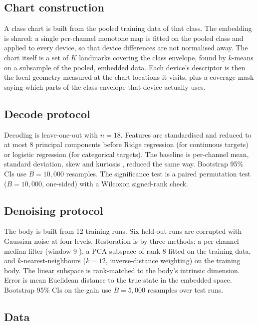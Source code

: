 \documentclass[11pt]{article}
\begin{document}
\subsection{Chart construction}
\label{sec:chart}

A class chart is built from the pooled training data of that class. The
embedding is shared: a single per-channel monotone map is fitted on the pooled
class and applied to every device, so that device differences are not
normalised away. The chart itself is a set of $K$ landmarks covering the class
envelope, found by $k$-means \cite{macqueen1967} on a subsample of the pooled,
embedded data. Each device's descriptor is then the local geometry measured at
the chart locations it visits, plus a coverage mask saying which parts of the
class envelope that device actually uses.

\subsection{Decode protocol}

Decoding is leave-one-out with $n=18$. Features are standardised and reduced
to at most 8 principal components before Ridge regression
\cite{hoerl1970} (for continuous targets) or logistic regression
\cite{cox1958} (for categorical targets). The baseline is per-channel mean,
standard deviation, skew \cite{pearson1895} and kurtosis
\cite{pearson1905}, reduced the same way. Bootstrap 95\% CIs use
$B = 10{,}000$ resamples. The significance test is a paired permutation test
($B = 10{,}000$, one-sided) with a Wilcoxon signed-rank
\cite{wilcoxon1945} check.

\subsection{Denoising protocol}

The body is built from 12 training runs. Six held-out runs are corrupted with
Gaussian noise at four levels. Restoration is by three methods: a per-channel
median filter (window 9 \cite{tukey1977}), a PCA subspace of rank 8
\cite{pearson1901} fitted on the training data, and $k$-nearest-neighbours
($k=12$, inverse-distance weighting) on the training body. The linear subspace
is rank-matched to the body's intrinsic dimension. Error is mean Euclidean
distance to the true state in the embedded space. Bootstrap 95\% CIs on the
gain use $B = 5{,}000$ resamples over test runs.

\subsection{Data}
\end{document}
